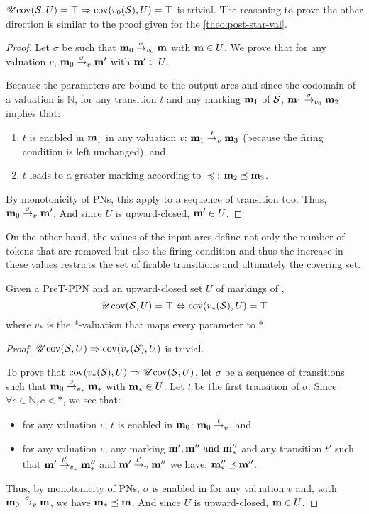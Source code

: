 \(\operatorname{\mathscr{U}cov}(\mathcal{S}, U) = \top \Rightarrow \operatorname{cov}(v_0(\mathcal{S}), U) = \top\) is trivial.
The reasoning to prove the other direction is similar to the proof given for the \autoref{theo:post-star-val}.

\begin{proof}
  Let $\sigma$ be such that $\mathbf{m}_0 \stackrel{\sigma}{\to}_{v_0} \mathbf{m}$ with $\mathbf{m} \in U$.
  We prove that for any valuation $v$, $\mathbf{m}_0 \stackrel{\sigma}{\to}_v \mathbf{m'}$ with $\mathbf{m'} \in U$.

  Because the parameters are bound to the output arcs and since the codomain of a valuation is $\mathbb{N}$, for any transition $t$ and any marking $\mathbf{m}_1$ of $\mathcal{S}$, $\mathbf{m}_1 \stackrel{\sigma}{\to}_{v_0} \mathbf{m}_2$ implies that:
  \begin{enumerate}
    \item $t$ is enabled in $\mathbf{m}_1$ in any valuation $v$: $\mathbf{m}_1 \stackrel{t}{\to}_v \mathbf{m}_3$ (because the firing condition is left unchanged), and
    \item $t$ leads to a greater marking according to $\preceq$: $\mathbf{m}_2 \preceq \mathbf{m}_3$.
  \end{enumerate}

  By monotonicity of \acp{PN}, this apply to a sequence of transition too.
  Thus, $\mathbf{m}_0 \stackrel{\sigma}{\to}_v \mathbf{m'}$.
  And since $U$ is upward-closed, $\mathbf{m'} \in U$.
\end{proof}

On the other hand, the values of the input arcs define not only the number of tokens that are removed but also the firing condition and thus the increase in these values restricts the set of firable transitions and ultimately the covering set.

\begin{theo}
  \label{theo:pre-star-val}
  Given a PreT-\ac{PPN} \SPTPm and an upward-closed set $U$ of markings of \PPN, \[\operatorname{\mathscr{U}cov}(\mathcal{S}, U) = \top \Leftrightarrow \operatorname{cov}(v_*(\mathcal{S}), U) = \top\] where $v_*$ is the *-valuation that maps every parameter to $*$.
\end{theo}

\begin{proof}
  $\operatorname{\mathscr{U}cov}(\mathcal{S}, U) \Rightarrow \operatorname{cov}(v_*(\mathcal{S}), U)$ is trivial.

  To prove that $\operatorname{cov}(v_*(\mathcal{S}), U) \Rightarrow \operatorname{\mathscr{U}cov}(\mathcal{S}, U)$, let $\sigma$ be a sequence of transitions such that $\mathbf{m}_0 \stackrel{\sigma}{\to}_{v_*} \mathbf{m}_*$ with $\mathbf{m}_* \in U$.
  Let $t$ be the first transition of $\sigma$.
  Since $\forall c \in \mathbb{N}, c < *$, we see that:
  \begin{itemize}
    \item for any valuation $v$, $t$ is enabled in $\mathbf{m}_0$: $\mathbf{m}_0 \stackrel{t}{\to}_{v}$, and
    \item for any valuation $v$, any marking $\mathbf{m}', \mathbf{m}'' \text{ and } \mathbf{m}''_*$ and any transition $t'$ such that $\mathbf{m}' \stackrel{t'}{\to}_{v_*} \mathbf{m}''_*$ and $\mathbf{m}' \stackrel{t'}{\to}_v \mathbf{m}''$ we have: $\mathbf{m}''_* \preceq \mathbf{m}''$.
  \end{itemize}

  Thus, by monotonicity of \acp{PN}, $\sigma$ is enabled in \mari for any valuation $v$ and, with $\mathbf{m}_0 \stackrel{\sigma}{\to}_v \mathbf{m}$, we have $\mathbf{m}_* \preceq \mathbf{m}$.
  And since $U$ is upward-closed, $\mathbf{m} \in U$.
\end{proof}

